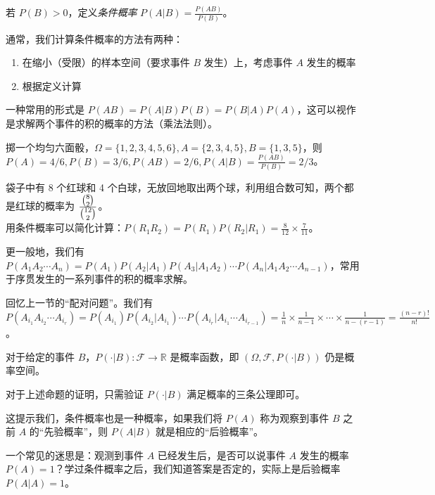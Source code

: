 \documentclass[../main.tex]{subfiles}
\begin{document}
\begin{definition}\label{def:1.6.1}
    若 $P(B)>0$，定义\emph{条件概率} $P(A|B)=\frac{P(AB)}{P(B)}$。
\end{definition}

通常，我们计算条件概率的方法有两种：
\begin{enumerate}
    \item 在缩小（受限）的样本空间（要求事件 $B$ 发生）上，考虑事件 $A$ 发生的概率
    \item 根据定义计算
\end{enumerate}

一种常用的形式是 $P(AB)=P(A|B)P(B)=P(B|A)P(A)$，这可以视作是求解两个事件的积的概率的方法（乘法法则）。

\begin{example}
    掷一个均匀六面骰，$\Omega=\{1,2,3,4,5,6\},A=\{2,3,4,5\},B=\{1,3,5\}$，则 $P(A)=4/6,P(B)=3/6,P(AB)=2/6,P(A|B)=\frac{P(AB)}{P(B)}=2/3$。
\end{example}

\begin{example}
    袋子中有 8 个红球和 4 个白球，无放回地取出两个球，利用组合数可知，两个都是红球的概率为 $\frac{\tbinom{8}{2}}{\tbinom{12}{2}}$。\\
    用条件概率可以简化计算：$P(R_1R_2)=P(R_1)P(R_2|R_1)=\frac{8}{12}\times\frac{7}{11}$。
\end{example}

更一般地，我们有 $P(A_1A_2\cdots A_n)=P(A_1)P(A_2|A_1)P(A_3|A_1A_2)\cdots P(A_n|A_1A_2\cdots A_{n-1})$，常用于序贯发生的一系列事件的积的概率求解。

\begin{example}
    回忆上一节的“配对问题”。我们有 $P(A_{i_1}A_{i_2}\cdots A_{i_r})=P(A_{i_1})P(A_{i_2}|A_{i_1})\cdots P(A_{i_r}|A_{i_1}\cdots A_{i_{r-1}})=\frac{1}{n}\times\frac{1}{n-1}\times\cdots\times\frac{1}{n-(r-1)}=\frac{(n-r)!}{n!}$。
\end{example}

\begin{proposition}
    对于给定的事件 $B$，$P(\cdot|B):\mathcal{F}\rightarrow\mathbb{R}$ 是概率函数，即 $(\Omega,\mathcal{F},P(\cdot|B))$ 仍是概率空间。
\end{proposition}

对于上述命题的证明，只需验证 $P(\cdot|B)$ 满足概率的三条公理即可。

这提示我们，条件概率也是一种概率，如果我们将 $P(A)$ 称为观察到事件 $B$ 之前 $A$ 的“先验概率”，则 $P(A|B)$ 就是相应的“后验概率”。

一个常见的迷思是：观测到事件 $A$ 已经发生后，是否可以说事件 $A$ 发生的概率 $P(A)=1$？学过条件概率之后，我们知道答案是否定的，实际上是后验概率 $P(A|A)=1$。
\end{document}
